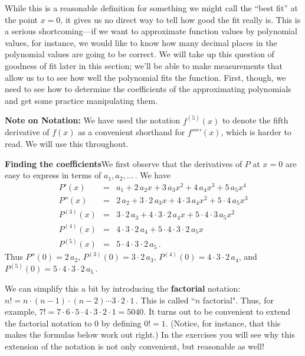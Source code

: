 {{{{While this is a reasonable definition for something we might call the ``best fit'' at the point $x=0$, it gives us no direct way to tell how good the fit really is.  This is a serious shortcoming---if we want to approximate function values by polynomial values, for instance, we would like to know how many decimal places in the polynomial values are going to be correct.  We will take up this question of goodness of fit later in this section;  we'll be able to make measurements that allow us to to see how well the polynomial fits the function.  First, though, we need to see how to determine the coefficients of the approximating polynomials and get some practice manipulating them.

\smallskip



{\bf Note on Notation:}  We have used the
 notation $f^{(5)}(x)$ to denote the fifth derivative of $f(x)$ as a convenient shorthand for $f'''''(x)$, which is harder to read.  We will use this throughout.

\smallskip


{\bf Finding the coefficients}\quad We first observe that the derivatives of $P$ at $x=0$ are easy to express in terms of $a_1,a_2,\ldots \, .$ We have
\begin{eqnarray*}
P'(x)&=&a_1+2\,a_2x+3\,a_3x^2+4\,a_4x^3+5\,a_5x^4 \\
P''(x)&=&2\,a_2+3\cdot2\,a_3x+4\cdot3\,a_4x^2+5\cdot4\,a_5x^3 \\
P^{(3)}(x)&=& 3\cdot2\,a_3+4\cdot3\cdot2\,a_4x+5\cdot4\cdot3\,a_5x^2 \\
P^{(4)}(x)&=& 4\cdot3\cdot2\,a_4+5\cdot4\cdot3\cdot2\,a_5x \\
P^{(5)}(x)&=&5\cdot4\cdot3\cdot2\,a_5 \, .
\end{eqnarray*}
Thus $P''(0)=2\,a_2$, $P^{(3)}(0)= 3\cdot2\,a_3$, $P^{(4)}(0)= 4\cdot3\cdot2\,a_4$, and $P^{(5)}(0)=5\cdot4\cdot3\cdot2\,a_5 \, .$  

We can simplify this a bit by introducing the {\bf factorial} notation: $n!=n\cdot(n-1)\cdot(n-2)\cdots3\cdot2\cdot1 \, .$ This is called ``$n$ factorial". 
Thus, for example, $7!=7\cdot6\cdot5\cdot4\cdot3\cdot2\cdot1 = 5040.$  It turns out to be convenient to extend the factorial notation to 0 by defining $0!=1.$ (Notice, for instance, that this makes the formulas below work out right.)  In the exercises you will see why this extension of the notation is not only convenient, but reasonable as well!

}}}}
